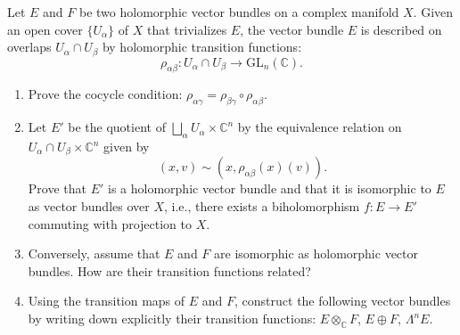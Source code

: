 \documentclass[12pt]{article}
\begin{document}
\begin{problab}{5}
    Let $E$ and $F$ be two holomorphic vector bundles on a complex manifold $X$. Given an open cover $\{ U_\alpha \}$ of $X$ that trivializes $E$, the vector bundle $E$ is described on overlaps $U_\alpha \cap U_\beta$ by holomorphic transition functions:
    \[
        \rho_{\alpha \beta} : U_\alpha \cap U_\beta \to \mathrm{GL}_n(\mathbb{C}).
    \]
    \begin{enumerate}
        \item Prove the cocycle condition: $\rho_{\alpha \gamma} = \rho_{\beta \gamma} \circ \rho_{\alpha \beta}$.
        \item Let $E'$ be the quotient of $\bigsqcup_\alpha U_\alpha \times \mathbb{C}^n$ by the equivalence relation on $U_\alpha \cap U_\beta \times \mathbb{C}^n$ given by
        \[
            (x, v) \sim (x, \rho_{\alpha \beta}(x)(v)).
        \]
        Prove that $E'$ is a holomorphic vector bundle and that it is isomorphic to $E$ as vector bundles over $X$, i.e., there exists a biholomorphism $f : E \to E'$ commuting with projection to $X$.
        
        \item Conversely, assume that $E$ and $F$ are isomorphic as holomorphic vector bundles. How are their transition functions related?
        
        \item Using the transition maps of $E$ and $F$, construct the following vector bundles by writing down explicitly their transition functions: $E \otimes_{\mathbb{C}} F$, $E \oplus F$, $\Lambda^n E$.
    \end{enumerate}
\end{problab}
\end{document}
